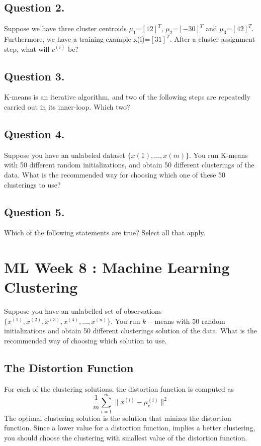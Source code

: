 \documentclass[11pt]{article} %
\begin{document}
\subsection*{Question 2.} 
Suppose we have three cluster centroids $\mu_1$=$[1 2]^T$, $\mu_2$=$[−3 0]^T$ and $\mu_3$=$[4 2]^T$. 
Furthermore, we have a training example x(i)=$[3 1]^T$. After a cluster assignment step, what will $c^{(i)}$ be?


\subsection*{Question 3.}
K-means is an iterative algorithm, and two of the following steps are repeatedly carried out in its inner-loop. Which two?


\subsection*{Question 4. }
Suppose you have an unlabeled dataset $\{x(1),\ldots,x(m)\}$. You run K-means with 50 different random
initializations, and obtain 50 different clusterings of the data. 
What is the recommended way for choosing which one of these 50 clusterings to use?

\subsection*{Question 5. }
Which of the following statements are true? Select all that apply.


\newpage
\section{ML Week 8 : Machine Learning Clustering}

Suppose you have an unlabelled set of observations$\{ x^{(1)},x^{(2)},x^{(3)},x^{(4)}, \ldots ,x^{(n)}\}$.
You run $k-$means with 50 random initializations and obtain 50 different clusterings solution of the data.
What is the recommended way of choosing which solution to use.

\subsection{The Distortion Function}
For each of the clustering solutions, the distortion function is computed as 
\[ \frac{1}{m} \sum^{m}_{i=1} \parallel x^{(i)} - \mu_c^{(i)}\parallel ^2 \]
The optimal clustering solution is the solution that minizes the distortion function.
Since a lower value for a distortion function, implies a better clustering, you should choose the clustering with 
smallest value of the distortion function.
\end{document}
